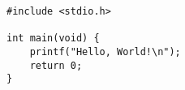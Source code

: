
\begin{lstlisting}[caption=XXXXのプログラム, label=list:List]
#include <stdio.h>

int main(void) {
    printf("Hello, World!\n");
    return 0;
}
\end{lstlisting}
\vspace{4mm}
